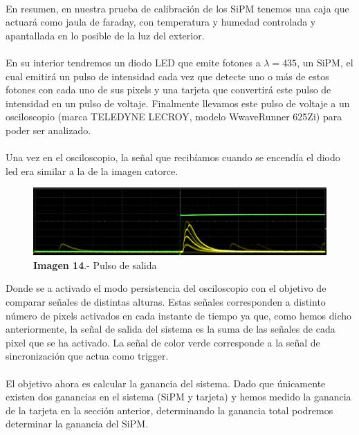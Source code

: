 \paragraph {}
En resumen, en nuestra prueba de calibración de los SiPM tenemos una caja que actuará como jaula de faraday, con temperatura y humedad controlada y apantallada en lo posible de la luz del exterior. 

\paragraph {}
En su interior tendremos un diodo LED que emite fotones a $\lambda=435$, un SiPM, el cual emitirá un pulso de intensidad cada vez que detecte uno o más de estos fotones con cada uno de sus pixels y una tarjeta que convertirá este pulso de intensidad en un pulso de voltaje. Finalmente llevamos este pulso de voltaje a un osciloscopio (marca TELEDYNE LECROY, modelo WwaveRunner 625Zi) para poder ser analizado. 

\paragraph {}
Una vez en el osciloscopio, la señal que recibíamos cuando se encendía el diodo led era similar a la de la imagen catorce.

\begin{figure}[hbtp]
\centering
\includegraphics[scale=0.2]{PulsoSalida.png}
\caption{\textbf{Imagen 14}.- Pulso de salida}
\end{figure}

Donde se a activado el modo persistencia del osciloscopio con el objetivo de comparar señales de distintas alturas. Estas señales corresponden a distinto número de pixels activados en cada instante de tiempo ya que, como hemos dicho anteriormente, la señal de salida del sistema es la suma de las señales de cada pixel que se ha activado. La señal de color verde corresponde a la señal de sincronización que actua como trigger.

\paragraph {}
El objetivo ahora es calcular la ganancia del sistema. Dado que únicamente existen dos ganancias en el sistema (SiPM y tarjeta) y hemos medido la ganancia de la tarjeta en la sección anterior, determinando la ganancia total podremos determinar la ganancia del SiPM. 

